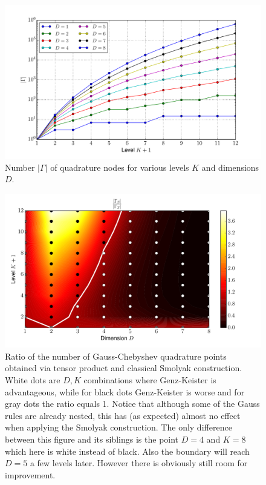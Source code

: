 \documentclass[a4paper,10pt]{article}
\begin{document}
\begin{figure}
  \centering
  \includegraphics[width=\linewidth]{./img/number_nodes_levdim_chebyshevu.pdf}
  \caption{Number $|\Gamma|$ of quadrature nodes for various levels $K$ and dimensions $D$.}
  \label{fig:number_nodes_levdim_chebyshevu}
\end{figure}

\begin{figure}[h]
  \centering
  \includegraphics[width=0.8\linewidth]{./img/smol_chebyshevu_ratio.pdf}
  \caption{Ratio of the number of Gauss-Chebyshev quadrature points obtained
  via tensor product and classical Smolyak construction. White dots are $D,K$
  combinations where Genz-Keister is advantageous, while for black dots
  Genz-Keister is worse and for gray dots the ratio equals 1.
  Notice that although some of the Gauss rules are already nested, this has
  (as expected) almost no effect when applying the Smolyak construction.
  The only difference between this figure and its siblings is the point
  $D=4$ and $K=8$ which here is white instead of black. Also the boundary
  will reach $D=5$ a few levels later. However there is obviously still
  room for improvement.}
  \label{fig:smol_chebyshevu_ratio}
\end{figure}
\end{document}

